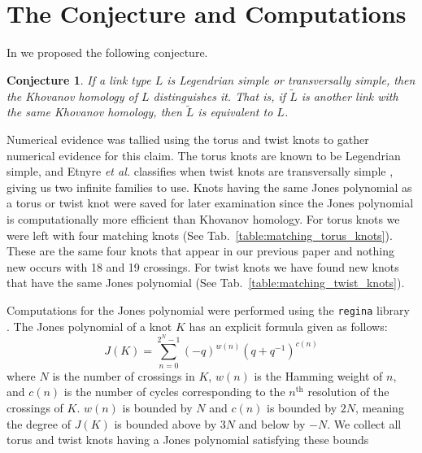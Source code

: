 \documentclass{article}
\theoremstyle{plain}
\newtheorem{conjecture}{Conjecture}
\begin{document}
    \section{The Conjecture and Computations}
        In \cite{ChernovMaguireLegendrianConjecture} we proposed the following
        conjecture.
        \begin{conjecture}
            If a link type $L$ is Legendrian simple or transversally simple,
            then the Khovanov homology of $L$ distinguishes it. That is,
            if $\tilde{L}$ is another link with the same Khovanov homology,
            then $\tilde{L}$ is equivalent to $L$.
        \end{conjecture}
        Numerical evidence was tallied using the torus and twist knots to gather
        numerical evidence for this claim. The torus knots are known to be
        Legendrian simple, and Etnyre \textit{et al.} classifies when twist
        knots are transversally simple
        \cite{EtnyreEtAlLegendrianAndTransverseTwistKnots},
        giving us two infinite families to use.
        Knots having the same Jones polynomial as a torus or twist knot were
        saved for later examination since the Jones polynomial is
        computationally more efficient than Khovanov homology. For torus knots
        we were left with four matching knots
        (See Tab.~\ref{table:matching_torus_knots}). These are the same four
        knots that appear in our previous paper and nothing new occurs with
        18 and 19 crossings. For twist knots we have found new knots that have
        the same Jones polynomial (See Tab.~\ref{table:matching_twist_knots}).
        \par\hfill\par
        Computations for the Jones polynomial were performed using the
        \texttt{regina} library \cite{regina}. The Jones polynomial of a knot
        $K$ has an explicit formula given as follows:
        \begin{equation}
            J(K)=\sum_{n=0}^{2^{N}-1}(-q)^{w(n)}(q+q^{-1})^{c(n)}
        \end{equation}
        where $N$ is the number of crossings in $K$, $w(n)$ is the Hamming
        weight of $n$, and $c(n)$ is the number of cycles corresponding to
        the $n^{\textrm{th}}$ resolution of the crossings of $K$. $w(n)$ is
        bounded by $N$ and $c(n)$ is bounded by $2N$, meaning the degree of
        $J(K)$ is bounded above by $3N$ and below by $-N$. We collect all
        torus and twist knots having a Jones polynomial satisfying these bounds
\end{document}
